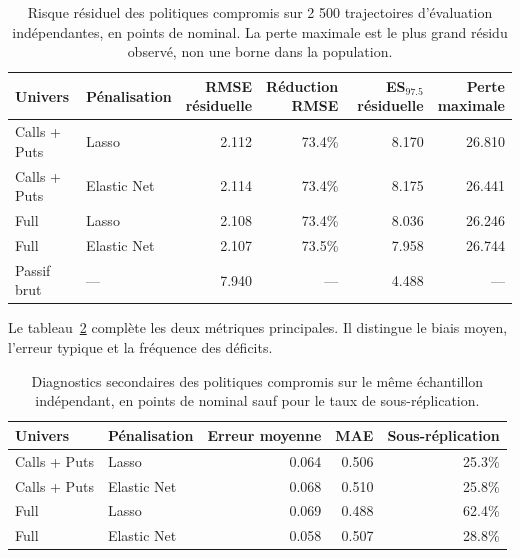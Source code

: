 \begin{table}[htbp]
\centering
\small
\begin{tabular}{llrrrr}
\toprule
Univers & Pénalisation & \shortstack[r]{RMSE\\résiduelle} & \shortstack[r]{Réduction\\RMSE} & \shortstack[r]{ES$_{97.5}$\\résiduelle} & \shortstack[r]{Perte\\maximale} \\
\midrule
Calls + Puts & Lasso & 2.112 & 73.4\% & 8.170 & 26.810 \\
Calls + Puts & Elastic Net & 2.114 & 73.4\% & 8.175 & 26.441 \\
Full & Lasso & 2.108 & 73.4\% & 8.036 & 26.246 \\
Full & Elastic Net & 2.107 & 73.5\% & 7.958 & 26.744 \\
\midrule
Passif brut & --- & 7.940 & --- & 4.488 & --- \\
\bottomrule
\end{tabular}
\caption{Risque résiduel des politiques compromis sur 2 500 trajectoires d'évaluation indépendantes, en points de nominal. La perte maximale est le plus grand résidu observé, non une borne dans la population.}
\label{tab:risk}
\end{table}

Le tableau~\ref{tab:secondary-risk-metrics} complète les deux métriques principales.
Il distingue le biais moyen, l'erreur typique et la fréquence des déficits.

\begin{table}[htbp]
\centering
\small
\begin{tabular}{llrrr}
\toprule
Univers & Pénalisation & Erreur moyenne & MAE & Sous-réplication \\
\midrule
Calls + Puts & Lasso & 0.064 & 0.506 & 25.3\% \\
Calls + Puts & Elastic Net & 0.068 & 0.510 & 25.8\% \\
Full & Lasso & 0.069 & 0.488 & 62.4\% \\
Full & Elastic Net & 0.058 & 0.507 & 28.8\% \\
\bottomrule
\end{tabular}
\caption{Diagnostics secondaires des politiques compromis sur le même échantillon indépendant, en points de nominal sauf pour le taux de sous-réplication.}
\label{tab:secondary-risk-metrics}
\end{table}


